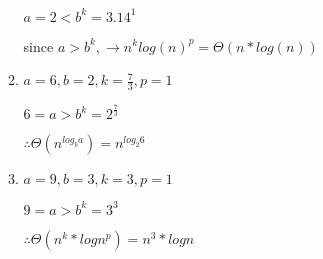 \documentclass[9pt]{article}
\begin{document}
\begin{enumerate}
\begin{enumerate}
  $a=2<b^k = 3.14^1$

  since $a> b^k, \rightarrow n^k log(n)^p = \Theta(n*log(n))$

  \item $a = 6, b=2,k=\frac{7}{3},p=1$
  
  $6=a>b^k = 2^{\frac{7}{3}}$

  $\therefore \Theta(n^{log_ba}) = n^{log_2 6}$

  \item $a=9,b=3,k=3,p=1$
  
  $9=a>b^k = 3^{3}$

  $\therefore \Theta(n^k*logn^p) = n^3*logn$


\end{enumerate}

\fi

\newpage

\vspace{5mm}


\end{enumerate}
\end{document}
